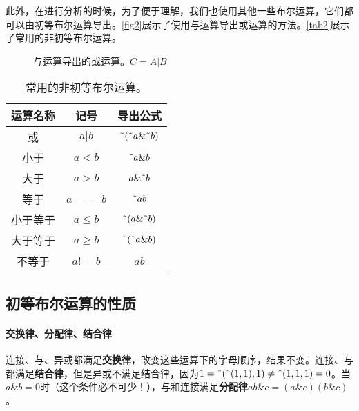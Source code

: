 此外，在进行分析的时候，为了便于理解，我们也使用其他一些布尔运算，它们都可以由初等布尔运算导出。\autoref{fig2}展示了使用与运算导出或运算的方法。\autoref{tab2}展示了常用的非初等布尔运算。

\begin{figure}[!ht]
    \centering
    \caption{与运算导出的或运算。$C=A|B$}
    \label{fig2}
\end{figure}

\begin{table}[!ht]
\centering
\begin{tabular}{|c|c|c|}
\hline
运算名称&记号&导出公式\\\hline
或&$a|b$&$\textrm{\~{}}(\textrm{\~{}}a\&\textrm{\~{}}b)$\\\hline
小于&$a<b$&$\textrm{\~{}}a\&b$\\\hline
大于&$a>b$&$a\&\textrm{\~{}}b$\\\hline
等于&$a==b$&$\textrm{\~{}}ab$\\\hline
小于等于&$a\le b$&$\textrm{\~{}}(a\&\textrm{\~{}}b)$\\\hline
大于等于&$a\ge b$&$\textrm{\~{}}(\textrm{\~{}}a\&b)$\\\hline
不等于&$a!=b$&$ab$\\\hline
\end{tabular}
\caption{常用的非初等布尔运算。}\label{tab2}
\end{table}

\subsection{初等布尔运算的性质}\label{sec9317}

\paragraph*{交换律、分配律、结合律}

连接、与、异或都满足\textbf{交换律}，改变这些运算下的字母顺序，结果不变。连接、与都满足\textbf{结合律}，但是异或不满足结合律，因为$1=\textrm{\^{}}(\textrm{\^{}}(1,1),1)\ne \textrm{\^{}}(1,1,1)=0$。当$a\&b=0$时（这个条件必不可少！），与和连接满足\textbf{分配律}$ab\&c=(a\&c)(b\&c)$。

